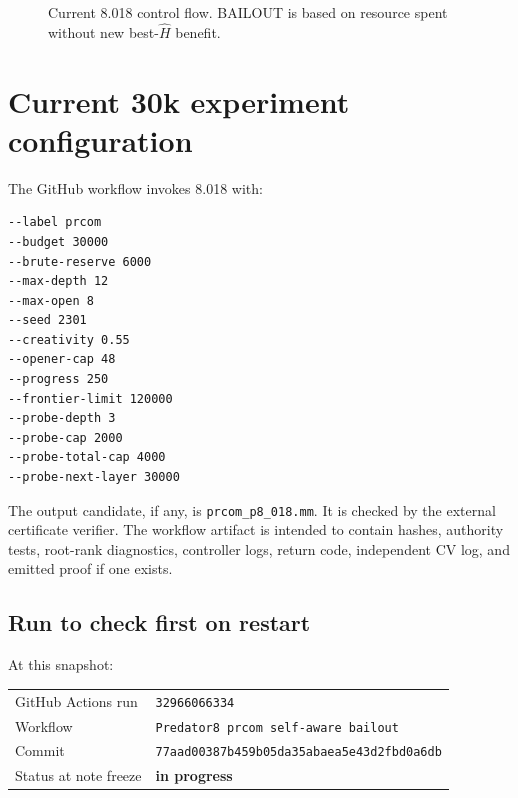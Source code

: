 \documentclass[11pt]{article}
\newcommand{\code}[1]{\texttt{#1}}
\begin{document}
\begin{figure}[H]
\caption{Current 8.018 control flow. BAILOUT is based on resource spent without new best-$\widehat H$ benefit.}
\end{figure}

\section{Current 30k experiment configuration}

The GitHub workflow invokes 8.018 with:
\begin{lstlisting}
--label prcom
--budget 30000
--brute-reserve 6000
--max-depth 12
--max-open 8
--seed 2301
--creativity 0.55
--opener-cap 48
--progress 250
--frontier-limit 120000
--probe-depth 3
--probe-cap 2000
--probe-total-cap 4000
--probe-next-layer 30000
\end{lstlisting}

The output candidate, if any, is \code{prcom\_p8\_018.mm}. It is checked by the external certificate verifier. The workflow artifact is intended to contain hashes, authority tests, root-rank diagnostics, controller logs, return code, independent CV log, and emitted proof if one exists.

\subsection{Run to check first on restart}

At this snapshot:
\begin{center}
\begin{tabular}{ll}
\toprule
GitHub Actions run & \code{32966066334} \\
Workflow & \code{Predator8 prcom self-aware bailout} \\
Commit & \code{77aad00387b459b05da35abaea5e43d2fbd0a6db} \\
Status at note freeze & \textbf{in progress} \\
\bottomrule
\end{tabular}
\end{center}
\end{document}
